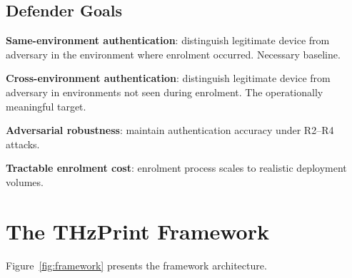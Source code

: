 \documentclass[sigconf,nonacm]{acmart}
\begin{document}
\subsection{Defender Goals}

\textbf{Same-environment authentication}: distinguish legitimate
device from adversary in the environment where enrolment occurred.
Necessary baseline.

\textbf{Cross-environment authentication}: distinguish legitimate
device from adversary in environments not seen during enrolment.
The operationally meaningful target.

\textbf{Adversarial robustness}: maintain authentication accuracy
under R2--R4 attacks.

\textbf{Tractable enrolment cost}: enrolment process scales to
realistic deployment volumes.

\section{The THzPrint Framework}

Figure~\ref{fig:framework} presents the framework architecture.
\end{document}
